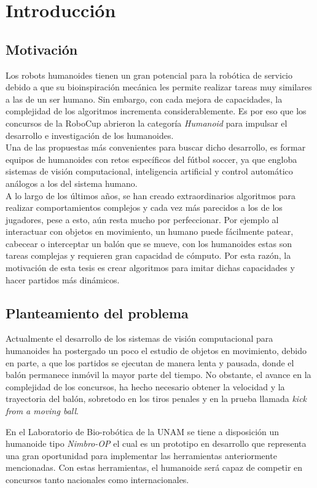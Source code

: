 \chapter{Introducción}

\section{Motivación}
	Los robots humanoides tienen un gran potencial para la robótica de servicio debido a que su bioinspiración mecánica les permite realizar tareas muy similares a las de un ser humano. Sin embargo, con cada mejora de capacidades, la complejidad de los algoritmos incrementa considerablemente. Es por eso que los concursos de la RoboCup abrieron la categoría \textit{Humanoid} para impulsar el desarrollo e investigación de los humanoides.
	\\
	Una de las propuestas más convenientes para buscar dicho desarrollo, es formar equipos de humanoides con retos específicos del fútbol soccer, ya que engloba sistemas de visión computacional, inteligencia artificial y control automático análogos a los del sistema humano.
\\	
	A lo largo de los últimos años, se han creado extraordinarios algoritmos para realizar comportamientos complejos y cada vez más parecidos a los de los jugadores, pese a esto, aún resta mucho por perfeccionar. Por ejemplo al interactuar con objetos en movimiento, un humano puede fácilmente patear, cabecear o interceptar un balón que se mueve, con los humanoides estas son tareas complejas y requieren gran capacidad de cómputo. 
	Por esta razón, la motivación de esta tesis es crear algoritmos para imitar dichas capacidades y hacer partidos más dinámicos.
	
\section{Planteamiento del problema}
	Actualmente el desarrollo de los sistemas de visión computacional para humanoides ha postergado un poco el estudio de objetos en movimiento, debido en parte, a que los partidos se ejecutan de manera lenta y pausada, donde el balón permanece inmóvil la mayor parte del tiempo. No obstante, el avance en la complejidad de los concursos, ha hecho necesario obtener la velocidad y la trayectoria del balón, sobretodo en los tiros penales y en la prueba llamada \textit{kick from a moving ball}.  

	En el Laboratorio de Bio-robótica de la UNAM se tiene a disposición un humanoide tipo \textit{Nimbro-OP} el cual es un prototipo en desarrollo que representa una gran oportunidad para implementar las herramientas anteriormente mencionadas. Con estas herramientas, el humanoide será capaz de competir en concursos tanto nacionales como internacionales.
	 
